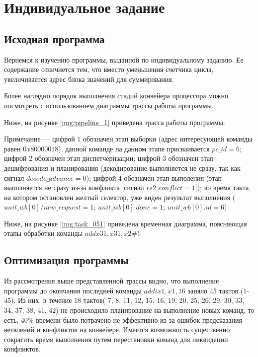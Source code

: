 \chapter{Индивидуальное задание}
\label{cha:research}

\section{Исходная программа}

Вернемся к изучению программы, выданной по индивидуальному заданию. Ее содержание отличиется тем, что вместо уменьшения счетчика цикла, увеличивается адрес блока значений для суммирования. 

Более наглядно порядок выполнения стадий конвейера процессора можно посмотреть с использованием диаграммы трассы работы программы.

Ниже, на рисунке \ref{img:pipeline_1} приведена трасса работы программы.


Примечание --- цифрой $1$ обозначен этап выборки (адрес интересующей команды равен $0x80000018$), данной команде на данном этапе присваивается $pc\_id = 6$; цифрой 2 обозначен этап диспетчеризации; цифрой 3 обозначен этап дешифрования и планирования (декодирование выполняется не сразу, так как сигнал $decode\_advance = 0$); цифрой 4 обозначен этап выполения (этап выполняется не сразу из-за конфликта [сигнал $rs2\_conflict = 1$]); во время такта, на котором остановлен желтый селектор, уже виден результат выполнения ($unit\_wb[0]/new\_request = 1$; $unit\_wb[0].done = 1$; $unit\_wb[0].id = 6$)

Ниже, на рисунке \ref{img:task_051} приведена временная диаграмма, поясняющая этапы обработки команды $add x31, x31, x2 \#!$.


\section{Оптимизация программы}

Из рассмотрения выше представленной трассы видно, что выполнение программы до окончания последней команды $addi x1, x1, 16$ заняло 45 тактов (1-45). Из них, в течение 18 тактов(
7, 8, 11, 12, 15, 16, 19, 20, 25, 26, 29, 30, 33, 34, 37, 38, 41, 42) не происходило планирование на выполнение новых команд, то есть, 40\% времени было потрачено не эффективно из-за ошибок предсказания ветвлений и конфликтов на конвейере. Имеется возможность существенно сократить время выполнения путем перестановки команд для ликвидации конфликтов. 

